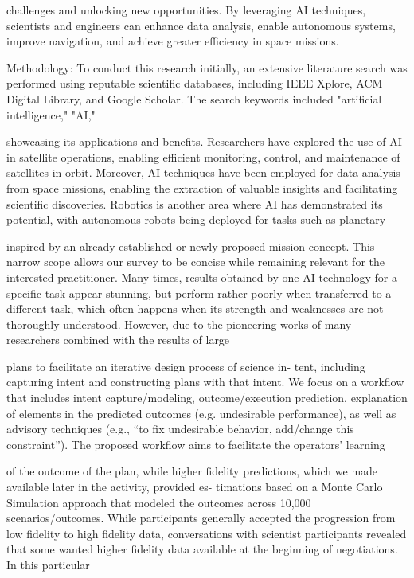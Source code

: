 \documentclass[a4paper,12pt]{article}
\begin{document}
challenges and unlocking new opportunities. By 
leveraging AI techniques, scientists and engineers 
can enhance data analysis, enable autonomous 
systems, improve navigation, and achieve greater 
efficiency in space missions. 
 
Methodology: 
To conduct this research initially, an extensive 
literature search was performed using reputable 
scientific databases, including IEEE Xplore, ACM 
Digital Library, and Google Scholar. The search 
keywords included "artificial intelligence," "AI,"

showcasing 
its 
applications 
and 
benefits. 
Researchers have explored the use of AI in satellite 
operations, enabling efficient monitoring, control, 
and maintenance of satellites in orbit. Moreover, AI 
techniques have been employed for data analysis 
from space missions, enabling the extraction of 
valuable 
insights 
and 
facilitating 
scientific 
discoveries. Robotics is another area where AI has 
demonstrated its potential, with autonomous robots 
being deployed for tasks such as planetary

inspired by an already established or newly proposed mission concept. This narrow
scope allows our survey to be concise while remaining relevant for the interested
practitioner.
Many times, results obtained by one AI technology for a speciﬁc task appear
stunning, but perform rather poorly when transferred to a different task, which often
happens when its strength and weaknesses are not thoroughly understood. However,
due to the pioneering works of many researchers combined with the results of large

plans to facilitate an iterative design process of science in-
tent, including capturing intent and constructing plans with
that intent.
We focus on a workﬂow that includes intent
capture/modeling, outcome/execution prediction, explanation
of elements in the predicted outcomes (e.g.
undesirable
performance), as well as advisory techniques (e.g., “to ﬁx
undesirable behavior, add/change this constraint”).
The
proposed workﬂow aims to facilitate the operators’ learning

of the outcome of the plan, while higher ﬁdelity predictions,
which we made available later in the activity, provided es-
timations based on a Monte Carlo Simulation approach that
modeled the outcomes across 10,000 scenarios/outcomes.
While participants generally accepted the progression from
low ﬁdelity to high ﬁdelity data, conversations with scientist
participants revealed that some wanted higher ﬁdelity data
available at the beginning of negotiations. In this particular
\end{document}
